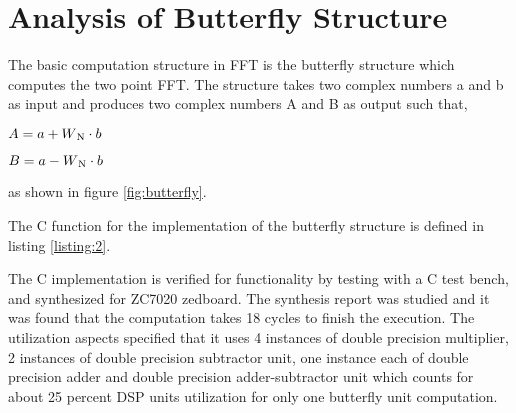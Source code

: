 \section {Analysis of Butterfly Structure}

The basic computation structure in FFT is the butterfly structure which computes the two point FFT. The structure takes  two complex numbers a and b as input and produces two complex numbers A and B as output such that,

\hspace{3cm} $A=a+W\textsubscript{N}\cdot b$

\hspace{3cm} $B=a-W\textsubscript{N}\cdot b$

\noindent as shown in figure \ref{fig:butterfly}.


\noindent The C function for the implementation of the butterfly structure is defined in listing \ref{listing:2}.


The C implementation is verified for functionality by testing with a C test bench, and synthesized for ZC7020 zedboard. The synthesis report was studied and it was found that the computation takes 18 cycles to finish the execution. The utilization aspects specified that it uses 4 instances of double precision multiplier, 2 instances of double precision subtractor unit, one instance each of double precision adder and double precision adder-subtractor unit which counts for about 25 percent DSP units utilization for only one butterfly unit computation. 
